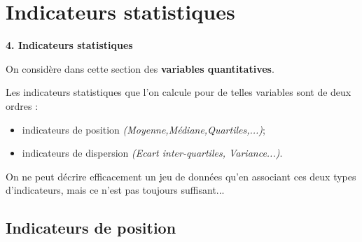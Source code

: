 \documentclass[aspectratio=169,xcolor=dvipsnames]{beamer}
\begin{document}
\section{Indicateurs statistiques}

\begin{frame}[plain]

\vfill

\begin{center}
{\huge \textcolor{nyubluedark}{\textbf{4. Indicateurs statistiques}}}
\end{center}

\vfill

\end{frame}

\begin{frame}

\vfill

\textcolor{nyubluedarker}{\faCogs} On considère dans cette section des \textbf{variables quantitatives}.

\vspace*{1cm}

\textcolor{nyubluedarker}{\faCogs} Les indicateurs statistiques que l'on calcule pour de telles variables sont de deux ordres :
	\begin{itemize}
	\item indicateurs de position \emph{(Moyenne,Médiane,Quartiles,...)};
	\item indicateurs de dispersion \emph{(Ecart inter-quartiles, Variance...)}.
	\end{itemize}

\vspace*{1cm}

\textcolor{nyubluedarker}{\faLightbulb[regular]} On ne peut décrire efficacement un jeu de données qu'en associant ces deux types d'indicateurs, mais ce n'est pas toujours suffisant...

\vfill
\end{frame}

\subsection{Indicateurs de position}
\end{document}

